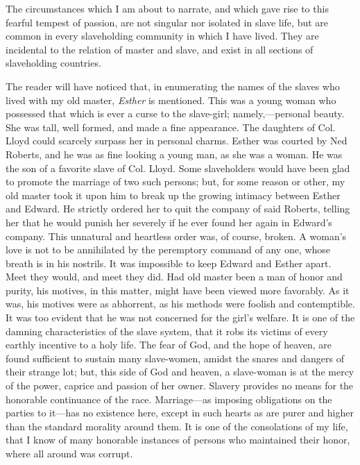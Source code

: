 The circumstances which I am about to narrate, and which gave rise to
this fearful tempest of passion, are not singular nor isolated in slave
life, but are common in every slaveholding community in which I have
lived. They are incidental to the relation of master and slave, and
exist in all sections of slaveholding countries.

The reader will have noticed that, in enumerating the names of the
slaves who lived with my old master, \emph{Esther} is mentioned. This
was a young woman who possessed that which is ever a curse to the
slave-girl; namely,---personal beauty. She was tall, well formed, and
made a fine appearance. The daughters of Col. Lloyd could scarcely
surpass her in personal charms. Esther was courted by Ned Roberts, and
he was as fine looking a young man, as she was a woman. He was the son
of a favorite slave of Col. Lloyd. Some slaveholders would have been
glad to promote the marriage of two such persons; but, for some reason
or other, my old master took it upon him to break up the growing
intimacy between Esther and Edward. {}He strictly ordered her to quit
the company of said Roberts, telling her that he would punish her
severely if he ever found her again in Edward's company. This unnatural
and heartless order was, of course, broken. A woman's love is not to be
annihilated by the peremptory command of any one, whose breath is in his
nostrils. It was impossible to keep Edward and Esther apart. Meet they
would, and meet they did. Had old master been a man of honor and purity,
his motives, in this matter, might have been viewed more favorably. As
it was, his motives were as abhorrent, as his methods were foolish and
contemptible. It was too evident that he was not concerned for the
girl's welfare. It is one of the damning characteristics of the slave
system, that it robs its victims of every earthly incentive to a holy
life. The fear of God, and the hope of heaven, are found sufficient to
sustain many slave-women, amidst the snares and dangers of their strange
lot; but, this side of God and heaven, a slave-woman is at the mercy of
the power, caprice and passion of her owner. Slavery provides no means
for the honorable continuance of the race. Marriage---as imposing
obligations on the parties to it---has no existence here, except in such
hearts as are purer and higher than the standard morality around them.
It is one of the consolations of my life, that I know of many honorable
instances of persons who maintained their honor, where all around was
corrupt.

